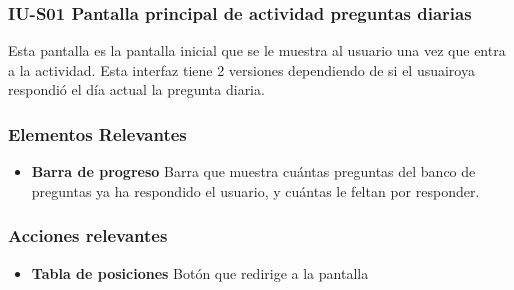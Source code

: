 
\subsubsection{IU-S01 Pantalla principal de actividad preguntas diarias}

 Esta pantalla es la pantalla inicial que se le muestra al usuario una vez que entra a la actividad. 
 Esta interfaz tiene 2 versiones dependiendo de si el usuairoya respondió el día actual la pregunta diaria.



\subsubsection{Elementos Relevantes}

    \begin{itemize}
    \item {\bf Barra de progreso}
        Barra que muestra cuántas preguntas del banco de preguntas ya ha respondido el usuario, y cuántas le feltan por responder.
    \end{itemize}

\subsubsection{Acciones relevantes}

    \begin{itemize}
    \item {\bf Tabla de posiciones}
        Botón que redirige a la pantalla 
    \end{itemize}

\clearpage
